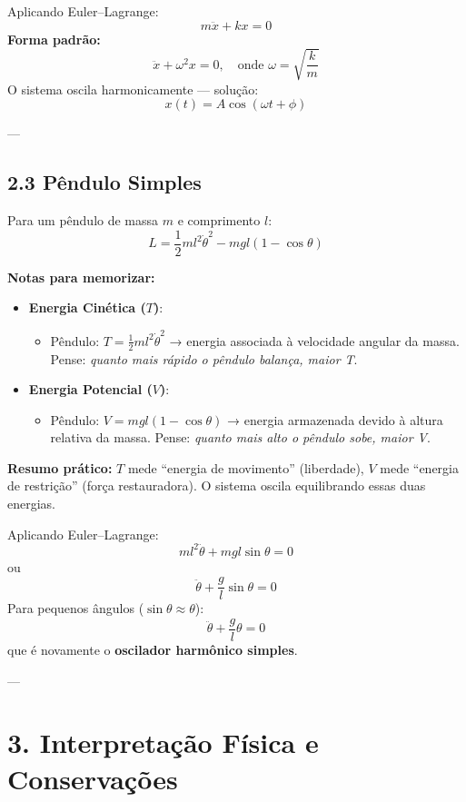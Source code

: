 \documentclass[a4paper,12pt]{article}
\begin{document}
Aplicando Euler–Lagrange:
\[
m \ddot{x} + kx = 0
\]
\textbf{Forma padrão:}
\[
\ddot{x} + \omega^2 x = 0, \quad \text{onde } \omega = \sqrt{\frac{k}{m}}
\]
O sistema oscila harmonicamente — solução:
\[
x(t) = A \cos(\omega t + \phi)
\]

---

\subsection*{2.3 Pêndulo Simples}
Para um pêndulo de massa $m$ e comprimento $l$:
\[
L = \frac{1}{2} m l^2 \dot{\theta}^2 - mgl(1 - \cos\theta)
\]

\textbf{Notas para memorizar:}
\begin{itemize}
    \item \textbf{Energia Cinética ($T$)}:
        \begin{itemize}
            \item Pêndulo: $T = \frac{1}{2} m l^2 \dot{\theta}^2$ 
                → energia associada à velocidade angular da massa. 
                Pense: \textit{quanto mais rápido o pêndulo balança, maior T}.
        \end{itemize}
    \item \textbf{Energia Potencial ($V$)}:
        \begin{itemize}
            \item Pêndulo: $V = m g l (1 - \cos\theta)$ 
                → energia armazenada devido à altura relativa da massa. 
                Pense: \textit{quanto mais alto o pêndulo sobe, maior V}.
        \end{itemize}
\end{itemize}
\textbf{Resumo prático:} $T$ mede “energia de movimento” (liberdade), $V$ mede “energia de restrição” (força restauradora). O sistema oscila equilibrando essas duas energias.

Aplicando Euler–Lagrange:
\[
m l^2 \ddot{\theta} + mgl \sin\theta = 0
\]
ou
\[
\ddot{\theta} + \frac{g}{l}\sin\theta = 0
\]
Para pequenos ângulos ($\sin\theta \approx \theta$):
\[
\ddot{\theta} + \frac{g}{l}\theta = 0
\]
que é novamente o \textbf{oscilador harmônico simples}.

---

\section*{3. Interpretação Física e Conservações}
\end{document}
